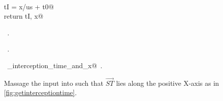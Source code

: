 \documentclass[10pt, english, oneside]{report}
\begin{document}
\begin{flushleft}
\begin{minipage}{\linewidth}
\begin{list}{}{}
\mbox{}\verb@@\\
\mbox{}\verb@    tI = x/us + t0@\\
\mbox{}\verb@    return tI, x@\\
\mbox{}\verb@@{\NWsep}
\end{list}
\vspace{-1.5ex}
\footnotesize
\begin{list}{}{\setlength{\itemsep}{-\parsep}\setlength{\itemindent}{-\leftmargin}}
\item \NWtxtMacroDefBy\ .
\item \NWtxtMacroRefIn\ .
\item \NWtxtIdentsDefed\nobreak\  \verb@get_interception_time_and_x@\nobreak\ .
\item{}
\end{list}
\end{minipage}\vspace{4ex}
\end{flushleft}

Massage the input into such that $\vec{ST}$ lies along the positive X-axis as in \autoref{fig:getinterceptiontime}. 
\end{document}
